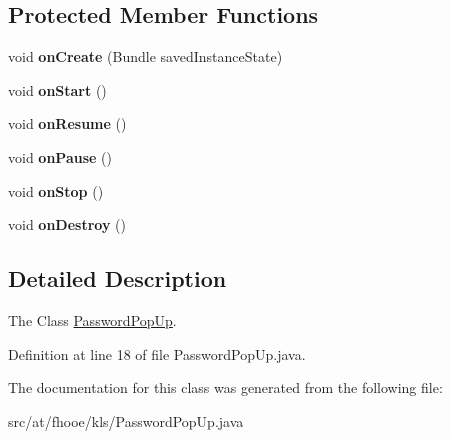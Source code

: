 \subsection*{Protected Member Functions}
\begin{DoxyCompactItemize}
\item 
\hypertarget{classat_1_1fhooe_1_1kls_1_1_password_pop_up_a960b5dc822633c17fd07b0dec1ea8f62}{void {\bfseries on\-Create} (Bundle saved\-Instance\-State)}\label{classat_1_1fhooe_1_1kls_1_1_password_pop_up_a960b5dc822633c17fd07b0dec1ea8f62}

\item 
\hypertarget{classat_1_1fhooe_1_1kls_1_1_password_pop_up_aef66f654efa390b1d302fd5843087279}{void {\bfseries on\-Start} ()}\label{classat_1_1fhooe_1_1kls_1_1_password_pop_up_aef66f654efa390b1d302fd5843087279}

\item 
\hypertarget{classat_1_1fhooe_1_1kls_1_1_password_pop_up_a222ba0f70f9edec21e58c434ee6eed87}{void {\bfseries on\-Resume} ()}\label{classat_1_1fhooe_1_1kls_1_1_password_pop_up_a222ba0f70f9edec21e58c434ee6eed87}

\item 
\hypertarget{classat_1_1fhooe_1_1kls_1_1_password_pop_up_ac33be96b8feb7d1d768b78d772d26617}{void {\bfseries on\-Pause} ()}\label{classat_1_1fhooe_1_1kls_1_1_password_pop_up_ac33be96b8feb7d1d768b78d772d26617}

\item 
\hypertarget{classat_1_1fhooe_1_1kls_1_1_password_pop_up_a7f62c12fd676421a1455b64436f19041}{void {\bfseries on\-Stop} ()}\label{classat_1_1fhooe_1_1kls_1_1_password_pop_up_a7f62c12fd676421a1455b64436f19041}

\item 
\hypertarget{classat_1_1fhooe_1_1kls_1_1_password_pop_up_aa480b0dcde0ac278c0a6a13f7d457fb5}{void {\bfseries on\-Destroy} ()}\label{classat_1_1fhooe_1_1kls_1_1_password_pop_up_aa480b0dcde0ac278c0a6a13f7d457fb5}

\end{DoxyCompactItemize}


\subsection{Detailed Description}
The Class \hyperlink{classat_1_1fhooe_1_1kls_1_1_password_pop_up}{Password\-Pop\-Up}. 

Definition at line 18 of file Password\-Pop\-Up.\-java.



The documentation for this class was generated from the following file\-:\begin{DoxyCompactItemize}
\item 
src/at/fhooe/kls/Password\-Pop\-Up.\-java\end{DoxyCompactItemize}
